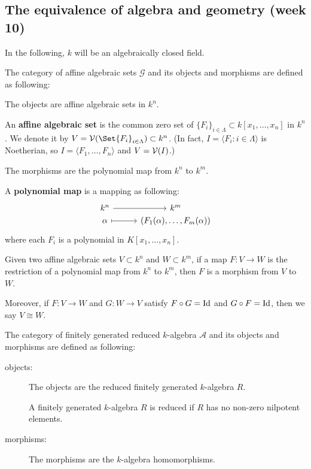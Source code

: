 \subsection{The equivalence of algebra and geometry (week 10)}

In the following, $k$ will be an algebraically closed field.
\begin{definition}
  The category of affine algebraic sets $\mathcal{G}$ and its objects and morphisms are defined as following:

  \begin{description}[leftmargin=0cm]
    \item[objects:] The objects are affine algebraic sets in $k^n$.

    An {\bf affine algebraic set} is the common zero set of $\{ F_i \}_{i \in \Lambda} \subset k[x_1, \dots, x_n]$
    in $k^n$.
    We denote it by $V = \Vc(\Set{F_i}_{i \in \Lambda}) \subset k^n$.
    (In fact, $I = \langle F_i : i \in \Lambda \rangle$ is Noetherian, so
    $I = \langle F_1, \dots, F_n \rangle$ and $V = \mathcal{V}(I)$.)

    \item[morphisms:] The morphisms are the polynomial map from $k^n$ to $k^m$.

      A {\bf polynomial map} is a mapping as following:
      \[
        \begin{tikzcd}[column sep=1cm,row sep=0ex]
            k^n \arrow[r]& k^m \\
           \alpha \arrow[r, mapsto] & (F_1(\alpha), \dots, F_m(\alpha))
        \end{tikzcd}
      \]
      where each $F_i$ is a polynomial in $K[x_1, \dots, x_n]$.

      Given two affine algebraic sets $V \subset k^n$ and $W \subset k^m$, if a map $F: V \to W$ is
      the restriction of a polynomial map from $k^n$ to $k^m$, then $F$ is a morphism from $V$ to $W$.

      Moreover, if $F: V \to W$ and $G : W \to V$ satisfy $F \circ G = {\rm Id}$ and $G \circ F = {\rm Id}$,
      then we say $V \cong W$.
  \end{description}
\end{definition}

\begin{definition}
  The category of finitely generated reduced $k$-algebra $\mathcal{A}$
  and its objects and morphisms are defined as following:

  \begin{description}
    \item[objects:] The objects are the reduced finitely generated $k$-algebra $R$.

    A finitely generated $k$-algebra $R$ is reduced if $R$ has no non-zero nilpotent elements.

    \item[morphisms:] The morphisms are the $k$-algebra homomorphisms.
  \end{description}
\end{definition}

